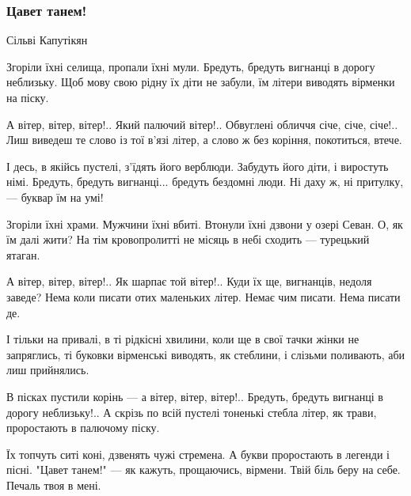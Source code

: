  
 
 

\subsubsection{Цавет танем!}
\label{sec:poetry.rus.lina_kostenko.armenia.cavet_tanem}

\obeycr
Сільві Капутікян

Згоріли їхні селища, пропали їхні мули.
Бредуть, бредуть вигнанці в дорогу неблизьку.
Щоб мову свою рідну їх діти не забули,
їм літери виводять вірменки на піску.

А вітер, вітер, вітер!..
Який палючий вітер!..
Обвуглені обличчя січе, січе, січе!..
Лиш виведеш те слово із тої в'язі літер,
а слово ж без коріння, покотиться, втече.

І десь, в якійсь пустелі, з'їдять його верблюди.
Забудуть його діти, і виростуть німі.
Бредуть, бредуть вигнанці...
бредуть бездомні люди.
Ні даху ж, ні притулку, --- буквар їм на умі!

Згоріли їхні храми. Мужчини їхні вбиті.
Втонули їхні дзвони у озері Севан.
О, як їм далі жити? На тім кровопролитті
не місяць в небі сходить --- турецький ятаган.

А вітер, вітер, вітер!..
Як шарпає той вітер!..
Куди їх ще, вигнанців, недоля заведе?
Нема коли писати отих маленьких літер.
Немає чим писати. Нема писати де.

І тільки на привалі, в ті рідкісні хвилини,
коли ще в свої тачки жінки не запряглись,
ті буковки вірменські виводять, як стеблини,
і слізьми поливають, аби лиш прийнялись.

В пісках пустили корінь --- а вітер, вітер, вітер!..
Бредуть, бредуть вигнанці в дорогу неблизьку!..
А скрізь по всій пустелі
тоненькі стебла літер,
як трави, проростають в палючому піску.

Їх топчуть ситі коні, дзвенять чужі стремена.
А букви проростають в легенди і пісні.
"Цавет танем!" --- як кажуть, прощаючись, вірмени.
Твій біль беру на себе. Печаль твоя в мені.
\restorecr

